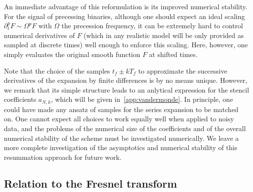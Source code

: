 \documentclass[aps,showpacs,twocolumn,
prd,superscriptaddress,nofootinbib]{revtex4-1}
\newcommand{\tf}{t_{f}}
\newcommand{\Tf}{T_{f}}
\begin{document}
An immediate advantage of this reformulation is its improved numerical stability. For the signal of precessing binaries, although one should expect an ideal scaling $\partial_{t}^{p} F \sim \Omega^{p} F$ with $\Omega$ the precession frequency, it can be extremely hard to control numerical derivatives of $F$ (which in any realistic model will be only provided as sampled at discrete times) well enough to enforce this scaling. Here, however, one simply evaluates the original smooth function $F$ at shifted times.

Note that the choice of the samples $\tf \pm k\Tf$ to approximate the successive derivatives of the expansion by finite differences is by no means unique. However, we remark that its simple structure leads to an anlytical expression for the stencil coefficients $a_{N,k}$, which will be given in~\ref{app:vandermonde}. In principle, one could have made any ansatz of samples for the series expansion to be matched on. One cannot expect all choices to work equally well when applied to noisy data, and the problems of the numerical size of the coefficients and of the overall numerical stability of the scheme must be investigated numerically. We leave a more complete investigation of the asymptotics and numerical stability of this resummation approach for future work.


\subsection{Relation to the Fresnel transform}
\label{subsec:fresneltransform}
\end{document}
